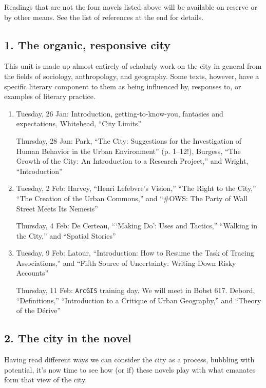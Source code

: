 Readings that are not the four novels listed above will be available on reserve
or by other means. See the list of references at the end for details.

\subsection*{1. The organic, responsive city}

  This unit is made up almost entirely of scholarly work on the city in general
  from the fields of sociology, anthropology, and geography. Some texts,
  however, have a specific literary component to them as being influenced by,
  responses to, or examples of literary practice. 

\begin{enumerate}

  \item Tuesday, 26 Jan: Introduction, getting-to-know-you, fantasies and expectations,
    Whitehead, “City Limits”

    Thursday, 28 Jan: Park, “The City: Suggestions for the Investigation of Human Behavior in the Urban Environment” (p. 1--12!), Burgess, “The Growth of the City: An Introduction to a Research Project,” and Wright, “Introduction”

  \item Tuesday, 2 Feb: Harvey, “Henri Lefebvre’s Vision,” “The Right to the City,” “The Creation of the Urban Commons,” and “\#OWS: The Party of Wall Street Meets Its Nemesis”

    Thursday, 4 Feb: De Certeau, “‘Making Do’: Uses and Tactics,” “Walking in the City,” and “Spatial Stories”

  \item Tuesday, 9 Feb: Latour, “Introduction: How to Resume the Task of Tracing Associations,” and “Fifth Source of Uncertainty: Writing Down Risky Accounts”

    Thursday, 11 Feb: \texttt{ArcGIS} training day. We will meet in Bobst 617. Debord, “Definitions,” “Introduction to a Critique of Urban Geography,” and “Theory of the Dérive”

\end{enumerate}

\subsection*{2. The city in the novel}

Having read different ways we can consider the city as a process, bubbling with
potential, it’s now time to see how (or if) these novels play with what
emanates form that view of the city.

